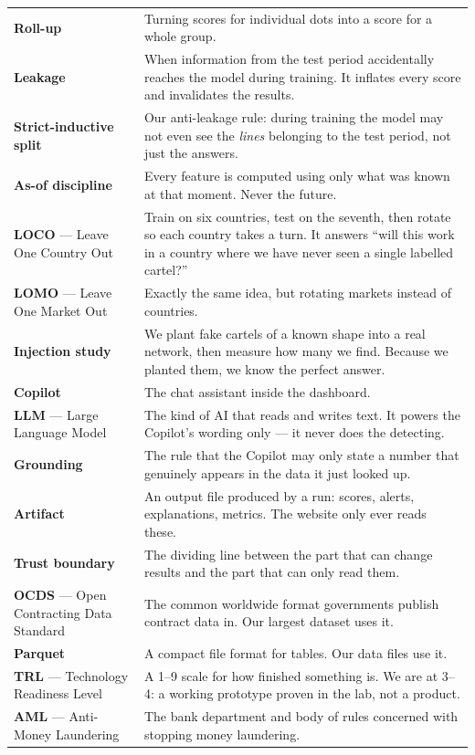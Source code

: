 \documentclass[11pt,a4paper]{article}
\begin{document}
\begin{longtable}{@{}p{4.1cm}p{11.4cm}@{}}
\textbf{Roll-up} & Turning scores for individual dots into a score for a whole
group. \\
\textbf{Leakage} & When information from the test period accidentally reaches the
model during training. It inflates every score and invalidates the results. \\
\textbf{Strict-inductive split} & Our anti-leakage rule: during training the model
may not even see the \emph{lines} belonging to the test period, not just the
answers. \\
\textbf{As-of discipline} & Every feature is computed using only what was known
at that moment. Never the future. \\
\textbf{LOCO} --- Leave One Country Out & Train on six countries, test on the
seventh, then rotate so each country takes a turn. It answers ``will this work in
a country where we have never seen a single labelled cartel?'' \\
\textbf{LOMO} --- Leave One Market Out & Exactly the same idea, but rotating
markets instead of countries. \\
\textbf{Injection study} & We plant fake cartels of a known shape into a real
network, then measure how many we find. Because we planted them, we know the
perfect answer. \\
\textbf{Copilot} & The chat assistant inside the dashboard. \\
\textbf{LLM} --- Large Language Model & The kind of AI that reads and writes text.
It powers the Copilot's wording only --- it never does the detecting. \\
\textbf{Grounding} & The rule that the Copilot may only state a number that
genuinely appears in the data it just looked up. \\
\textbf{Artifact} & An output file produced by a run: scores, alerts,
explanations, metrics. The website only ever reads these. \\
\textbf{Trust boundary} & The dividing line between the part that can change
results and the part that can only read them. \\
\textbf{OCDS} --- Open Contracting Data Standard & The common worldwide format
governments publish contract data in. Our largest dataset uses it. \\
\textbf{Parquet} & A compact file format for tables. Our data files use it. \\
\textbf{TRL} --- Technology Readiness Level & A 1--9 scale for how finished
something is. We are at 3--4: a working prototype proven in the lab, not a
product. \\
\textbf{AML} --- Anti-Money Laundering & The bank department and body of rules
concerned with stopping money laundering. \\
\bottomrule
\end{longtable}
\end{document}
